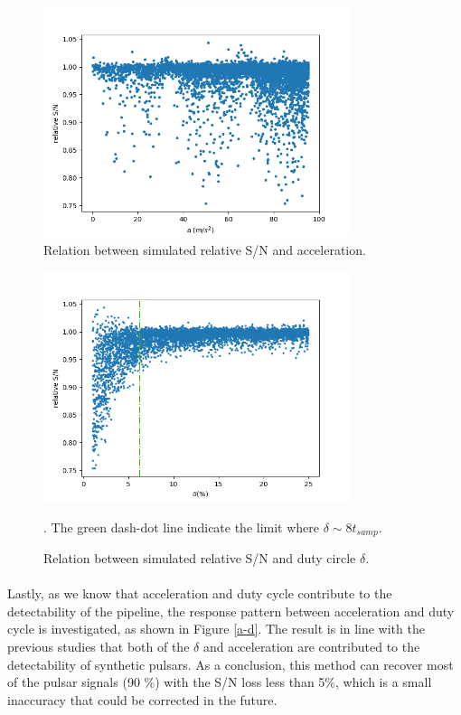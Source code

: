 \documentclass[thesis_msc.tex]{subfiles}
\begin{document}
\begin{figure}[h!]
\centering
\includegraphics[width=0.80\textwidth]{figures/A}
\caption{Relation between simulated relative S/N and acceleration.  }\label{a_twice}
\end{figure}

\begin{figure}[h!]
\centering
\includegraphics[width=0.80\textwidth]{figures/duty_twice}
\caption{Relation between simulated relative S/N and duty circle $\delta$.}\label{duty_twice}. The green dash-dot line indicate the limit where $\delta \sim 8t_{samp}$.
\end{figure}

\paragraph{} Lastly, as we know that acceleration and duty cycle contribute to the detectability of the pipeline, the response pattern between acceleration and duty cycle is investigated, as shown in Figure \ref{a-d}. The result is in line with the previous studies that both of the $\delta$ and acceleration are contributed to the detectability of synthetic pulsars. %
As a conclusion, this method can recover most of the pulsar signals (90 \%) with the S/N loss less than 5\%, which is a small inaccuracy that could be corrected in the future. 
\end{document}
